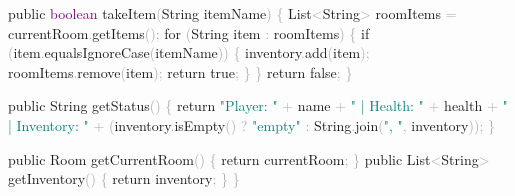 \documentclass[
  justified,
  openright,
]{tufte-book}
\newcommand{\BuiltInTok}[1]{#1}
\newcommand{\ControlFlowTok}[1]{\textcolor{BrandBlue}{#1}}
\newcommand{\DataTypeTok}[1]{\textcolor{Purple}{#1}}
\newcommand{\FunctionTok}[1]{\textcolor{BrandBlue}{#1}}
\newcommand{\KeywordTok}[1]{\textcolor{BrandBlue}{#1}}
\newcommand{\NormalTok}[1]{#1}
\newcommand{\OperatorTok}[1]{\textcolor{DarkGray}{#1}}
\newcommand{\StringTok}[1]{\textcolor{Teal}{#1}}
\newenvironment{Shaded}{%
  \begin{snugshade}
}{%
  \end{snugshade}
}
\begin{document}
\begin{Shaded}
\begin{Highlighting}[]
    \KeywordTok{public} \DataTypeTok{boolean} \FunctionTok{takeItem}\OperatorTok{(}\BuiltInTok{String}\NormalTok{ itemName}\OperatorTok{)} \OperatorTok{\{}
        \BuiltInTok{List}\OperatorTok{\textless{}}\BuiltInTok{String}\OperatorTok{\textgreater{}}\NormalTok{ roomItems }\OperatorTok{=}\NormalTok{ currentRoom}\OperatorTok{.}\FunctionTok{getItems}\OperatorTok{();}
        \ControlFlowTok{for} \OperatorTok{(}\BuiltInTok{String}\NormalTok{ item }\OperatorTok{:}\NormalTok{ roomItems}\OperatorTok{)} \OperatorTok{\{}
            \ControlFlowTok{if} \OperatorTok{(}\NormalTok{item}\OperatorTok{.}\FunctionTok{equalsIgnoreCase}\OperatorTok{(}\NormalTok{itemName}\OperatorTok{))} \OperatorTok{\{}
\NormalTok{                inventory}\OperatorTok{.}\FunctionTok{add}\OperatorTok{(}\NormalTok{item}\OperatorTok{);}
\NormalTok{                roomItems}\OperatorTok{.}\FunctionTok{remove}\OperatorTok{(}\NormalTok{item}\OperatorTok{);}
                \ControlFlowTok{return} \KeywordTok{true}\OperatorTok{;}
            \OperatorTok{\}}
        \OperatorTok{\}}
        \ControlFlowTok{return} \KeywordTok{false}\OperatorTok{;}
    \OperatorTok{\}}

    \KeywordTok{public} \BuiltInTok{String} \FunctionTok{getStatus}\OperatorTok{()} \OperatorTok{\{}
        \ControlFlowTok{return} \StringTok{"Player: "} \OperatorTok{+}\NormalTok{ name }\OperatorTok{+} \StringTok{" | Health: "} \OperatorTok{+}\NormalTok{ health }\OperatorTok{+}
               \StringTok{" | Inventory: "} \OperatorTok{+} \OperatorTok{(}\NormalTok{inventory}\OperatorTok{.}\FunctionTok{isEmpty}\OperatorTok{()} \OperatorTok{?} \StringTok{"empty"} \OperatorTok{:} \BuiltInTok{String}\OperatorTok{.}\FunctionTok{join}\OperatorTok{(}\StringTok{", "}\OperatorTok{,}\NormalTok{ inventory}\OperatorTok{));}
    \OperatorTok{\}}

    \KeywordTok{public}\NormalTok{ Room }\FunctionTok{getCurrentRoom}\OperatorTok{()} \OperatorTok{\{} \ControlFlowTok{return}\NormalTok{ currentRoom}\OperatorTok{;} \OperatorTok{\}}
    \KeywordTok{public} \BuiltInTok{List}\OperatorTok{\textless{}}\BuiltInTok{String}\OperatorTok{\textgreater{}} \FunctionTok{getInventory}\OperatorTok{()} \OperatorTok{\{} \ControlFlowTok{return}\NormalTok{ inventory}\OperatorTok{;} \OperatorTok{\}}
\OperatorTok{\}}
\end{Highlighting}
\end{Shaded}
\end{document}
